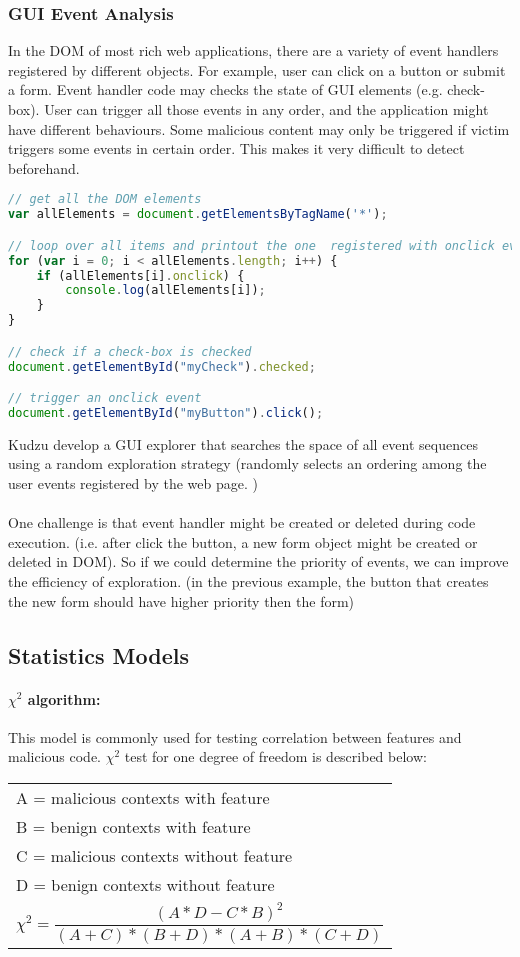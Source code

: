 \documentclass[11pt]{article}
\begin{document}
\subsubsection{GUI Event Analysis}
In the DOM of most rich web applications, there are a variety of event handlers registered by different objects. For example, user can click on a button or submit a form. Event handler code may checks the state of GUI elements (e.g. check-box). User can trigger all those events in any order, and the application might have different behaviours. Some malicious content may only be triggered if victim triggers some events in certain order. This makes it very difficult to detect beforehand.
\begin{lstlisting}[language=JavaScript, title=(examples of finding and triggering GUI elements in DOM)]
// get all the DOM elements
var allElements = document.getElementsByTagName('*');

// loop over all items and printout the one  registered with onclick event
for (var i = 0; i < allElements.length; i++) {
	if (allElements[i].onclick) {
		console.log(allElements[i]);
	}
}

// check if a check-box is checked
document.getElementById("myCheck").checked;

// trigger an onclick event
document.getElementById("myButton").click();
\end{lstlisting}
Kudzu \cite{Kudzu} develop a GUI explorer that searches the space of all event sequences using a random exploration strategy (randomly selects an ordering among the user events registered by the web page. ) \\ \\
One challenge is that event handler might be created or deleted during code execution. (i.e. after click the button, a new form object might be created or deleted  in DOM). So if we could determine the priority of events, we can improve the efficiency of exploration. (in the previous example, the button that creates the new form should have higher priority then the form)
\newpage
\subsection{Statistics Models}
\paragraph{$\chi^{2}$ algorithm:} 
This model is commonly used for testing correlation between features and malicious code. $\chi^{2}$ test for one degree of freedom is described below:
\begin{center}
\begin{tabular}{ |p{10cm}| } 
\hline
A = malicious contexts with feature \\
B = benign contexts with feature \\
C = malicious contexts without feature \\
D = benign contexts without feature \\
$$\chi^{2}=\frac{(A*D-C*B)^{2}}{(A+C)*(B+D)*(A+B)*(C+D)}$$ \\
\hline
\end{tabular}
\end{center}
\phantom \\
\end{document}

